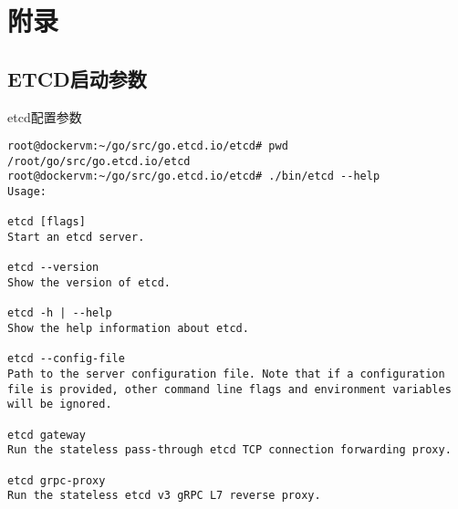 \chapter{附录}
\mylineskip

\renewcommand{\theFancyVerbLine}{\sffamily\textcolor[rgb]{0.6,0.2,0.3}{\normalsize\oldstylenums{\arabic{FancyVerbLine}}}}

\section{ETCD启动参数}
{\noindent etcd配置参数}\label{code_appendix_etcd_help}
\begin{verbatim}
root@dockervm:~/go/src/go.etcd.io/etcd# pwd
/root/go/src/go.etcd.io/etcd
root@dockervm:~/go/src/go.etcd.io/etcd# ./bin/etcd --help
Usage:

etcd [flags]
Start an etcd server.

etcd --version
Show the version of etcd.

etcd -h | --help
Show the help information about etcd.

etcd --config-file
Path to the server configuration file. Note that if a configuration file is provided, other command line flags and environment variables will be ignored.

etcd gateway
Run the stateless pass-through etcd TCP connection forwarding proxy.

etcd grpc-proxy
Run the stateless etcd v3 gRPC L7 reverse proxy.



\end{verbatim}
